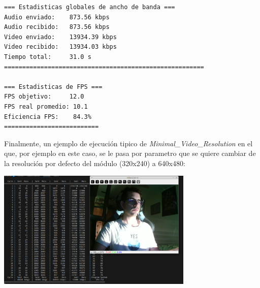\begin{lstlisting}[language=bash,basicstyle=\ttfamily\scriptsize]
=== Estadisticas globales de ancho de banda ===
Audio enviado:    873.56 kbps
Audio recibido:   873.56 kbps
Video enviado:    13934.39 kbps
Video recibido:   13934.03 kbps
Tiempo total:     31.0 s
=======================================================

=== Estadisticas de FPS ===
FPS objetivo:     12.0
FPS real promedio: 10.1
Eficiencia FPS:    84.3%
==========================
\end{lstlisting}

\newpage

Finalmente, un ejemplo de ejecución tipico de \textit{Minimal\_Video\_Resolution} en el que, por ejemplo en este caso, se le pasa por parametro que se quiere cambiar de la resolución por defecto del módulo (320x240) a 640x480:
\begin{center}
	\includegraphics[width = 0.7\textwidth]{images/pruebas/ejecuion_normal_resolution.png}
	\label{fig:ejecucion_resolution}
\end{center}
\vspace{\baselineskip}

